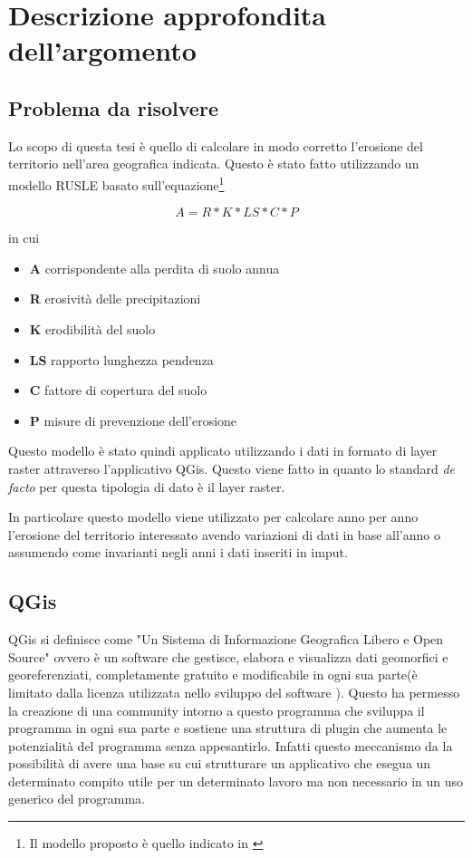 
\chapter{Descrizione approfondita dell'argomento}
\label{cap:descrizione}
\section{Problema da risolvere} Lo scopo di questa tesi è quello di calcolare in
modo corretto l'erosione del territorio nell'area geografica indicata. Questo è
stato fatto utilizzando un modello RUSLE basato sull'equazione\footnote{Il
modello proposto è quello indicato in \cite[p.~37]{tesi:ambientale}}

\begin{equation}
A = R * K * LS * C * P
\end{equation}

in cui
\begin{itemize}
\item \textbf{A} corrispondente alla perdita di suolo annua
\item \textbf{R} erosività delle precipitazioni
\item \textbf{K} erodibilità del suolo
\item \textbf{LS} rapporto lunghezza pendenza
\item \textbf{C} fattore di copertura del suolo
\item \textbf{P} misure di prevenzione dell'erosione
\end{itemize}

Questo modello è stato quindi applicato utilizzando i dati in formato di layer raster attraverso l'applicativo QGis.
Questo viene fatto in quanto lo standard \textit{de facto} per questa tipologia di dato è il layer raster.


In particolare questo modello viene utilizzato per calcolare anno per anno l'erosione del territorio interessato avendo variazioni di dati in base all'anno o assumendo come invarianti negli anni i dati inseriti in imput.

\section{QGis}

QGis si definisce come "Un Sistema di Informazione Geografica Libero e Open Source"\cite{site:qgis} ovvero è un software che gestisce, elabora e visualizza dati geomorfici e georeferenziati, completamente gratuito e modificabile in ogni sua parte(è limitato dalla licenza utilizzata nello sviluppo del software \cite{site:cc3}).
Questo ha permesso la creazione di una community intorno a questo programma che sviluppa il programma in ogni sua parte e sostiene una struttura di plugin che aumenta le potenzialità del programma senza appesantirlo.
Infatti questo meccanismo da la possibilità di avere una base su cui strutturare un applicativo che esegua un determinato compito utile per un determinato lavoro ma non necessario in un uso generico del programma.

